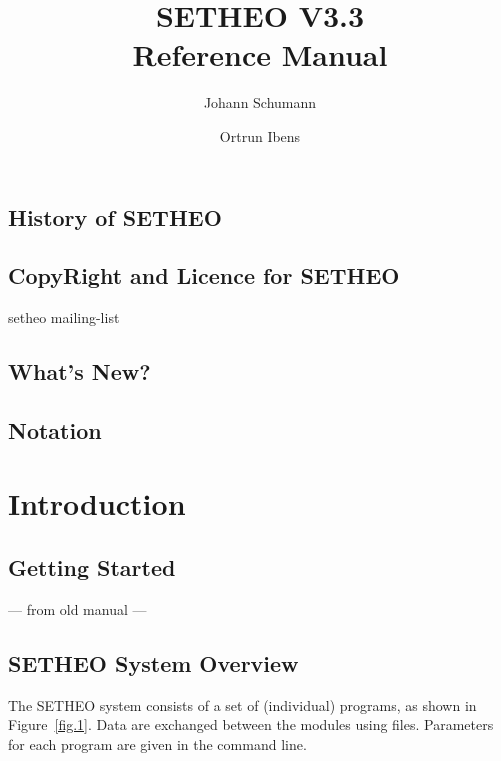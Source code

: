 

\def\SAM{{\sc S\kern-.13em\lower.45ex\hbox{A}\kern-.13emM}}



\title{SETHEO V3.3\\
Reference Manual}

\author{Johann Schumann \and Ortrun Ibens}

\maketitle

\tableofcontents

\section*{\bf History of SETHEO}

\section*{\bf CopyRight and Licence for SETHEO}

setheo mailing-list

\section*{\bf What's New?}

\section*{Notation}



\chapter{Introduction}

\section{Getting Started}

--- from old manual ---



\section{SETHEO System Overview}

The SETHEO system consists of a set of (individual) programs,
as shown in Figure~\ref{fig.1}. Data are exchanged between the
modules using files. Parameters for each program are given in the
command line.

